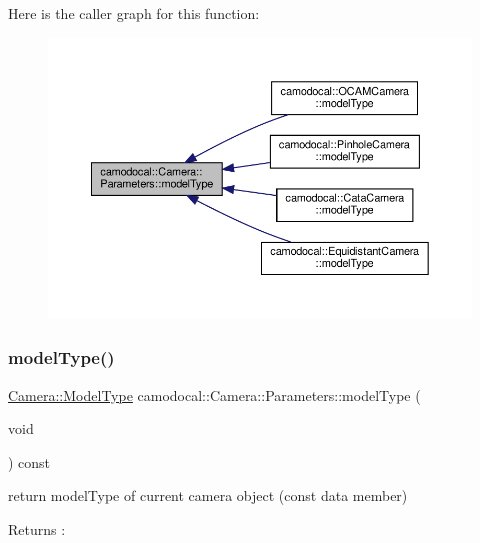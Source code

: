 Here is the caller graph for this function\+:\nopagebreak
\begin{figure}[H]
\begin{center}
\leavevmode
\includegraphics[width=350pt]{classcamodocal_1_1Camera_1_1Parameters_aab8170228d7e26e10b231c5960d5ddf7_icgraph}
\end{center}
\end{figure}
\mbox{\label{classcamodocal_1_1Camera_1_1Parameters_a6e4cf944dfed64a4204ee7b7609af2f7}} 
\subsubsection{\texorpdfstring{model\+Type()}{modelType()}\hspace{0.1cm}{\footnotesize\ttfamily [2/2]}}
{\footnotesize\ttfamily \hyperlink{classcamodocal_1_1Camera_a663bb19b7b1f38f6d1b7eeb0890183ff}{Camera\+::\+Model\+Type} camodocal\+::\+Camera\+::\+Parameters\+::model\+Type (\begin{DoxyParamCaption}\item[{void}]{ }\end{DoxyParamCaption}) const}



return model\+Type of current camera object (const data member) 

\begin{DoxyReturn}{Returns}
\+: 
\end{DoxyReturn}


